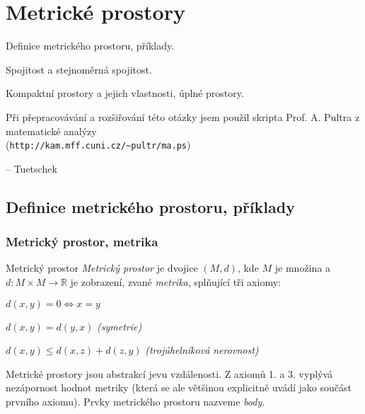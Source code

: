 \def\Real{\mathbb{R}}
\def\Euklid{\mathbb{E}}
\def\impl{\ \Rightarrow\ }

\section{Metrické prostory}

\begin{pozadavky}
\begin{pitemize}
    \item Definice metrického prostoru, příklady.
    \item Spojitost a stejnoměrná spojitost.
    \item Kompaktní prostory a jejich vlastnosti, úplné prostory.
\end{pitemize}
\end{pozadavky}

\begin{center}
Při přepracovávání a rozšiřování této otázky jsem použil skripta Prof. A. Pultra z matematické analýzy \\
(\texttt{http://kam.mff.cuni.cz/\~{}pultr/ma.ps})
\end{center}
\begin{flushright}
-- Tuetschek
\end{flushright}

\subsection{Definice metrického prostoru, příklady}

\subsubsection*{Metrický prostor, metrika}

\begin{definiceN}{Metrický prostor}
\emph{Metrický prostor} je dvojice $(M, d)$, kde $M$ je množina a $d: M \times M \rightarrow \mathbb{R}$ je zobrazení, zvané \emph{metrika}, splňující tři axiomy:
\begin{penumerate}
\item $d(x, y) = 0 \Leftrightarrow x = y$
\item $d(x, y) = d(y, x)$ \hfill \emph{(symetrie)}
\item $d(x, y) \le d(x, z) + d(z, y)$ \hfill\emph{(trojúhelníková nerovnost)}
\end{penumerate}
Metrické prostory jsou abstrakcí jevu vzdálenosti. Z axiomů 1. a 3. vyplývá nezápornost hodnot metriky (která se ale většinou explicitně uvádí jako součást prvního axiomu). Prvky metrického prostoru nazveme \emph{body}.
\end{definiceN}

